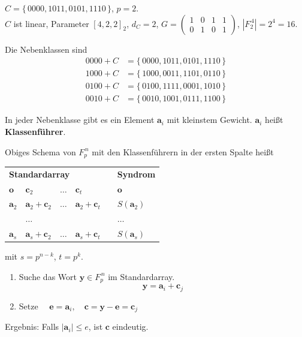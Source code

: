 \begin{beispiel}
$C = \{\, 0000, 1011, 0101, 1110 \,\}$, $p = 2$.\\
$C$ ist linear, Parameter $[4,2,2]_2$, $d_C = 2$,
$G = \begin{pmatrix} 1 & 0 & 1 & 1 \\ 0 & 1 & 0 & 1 \end{pmatrix}$, \quad $|F_2^{\,4}| = 2^4 = 16$.

Die Nebenklassen sind
\begin{align*}
  0000 + C &= \{\, 0000, 1011, 0101, 1110 \,\}\\
  1000 + C &= \{\, 1000, 0011, 1101, 0110 \,\}\\
  0100 + C &= \{\, 0100, 1111, 0001, 1010 \,\}\\
  0010 + C &= \{\, 0010, 1001, 0111, 1100 \,\}
\end{align*}
\end{beispiel}

\begin{definition}
In jeder Nebenklasse gibt es ein Element $\mathbf{a}_i$ mit kleinstem Gewicht.
$\mathbf{a}_i$ heißt \textbf{Klassenführer}.

Obiges Schema von $F_p^{\,n}$ mit den Klassenführern in der ersten Spalte heißt

\begin{center}
\begin{tabular}{llllll}
\multicolumn{4}{l}{\textbf{Standardarray}} & & \textbf{Syndrom}\\
$\mathbf{o}$ & $\mathbf{c}_2$ & $\dots$ & $\mathbf{c}_t$ & & $\mathbf{o}$\\
$\mathbf{a}_2$ & $\mathbf{a}_2 + \mathbf{c}_2$ & $\dots$ & $\mathbf{a}_2 + \mathbf{c}_t$ & & $S(\mathbf{a}_2)$\\
 & $\dots$ & & & & $\dots$\\
$\mathbf{a}_s$ & $\mathbf{a}_s + \mathbf{c}_2$ & $\dots$ & $\mathbf{a}_s + \mathbf{c}_t$ & & $S(\mathbf{a}_s)$
\end{tabular}
\end{center}
mit $s = p^{n-k}$, $t = p^k$.
\end{definition}

\begin{algorithmus}
\begin{enumerate}[label=\arabic*. Schritt:, leftmargin=*]
  \item Suche das Wort $\mathbf{y} \in F_p^{\,n}$ im Standardarray.
  \[ \mathbf{y} = \mathbf{a}_i + \mathbf{c}_j \]
  \item Setze $\quad \mathbf{e} = \mathbf{a}_i,\quad \mathbf{c} = \mathbf{y} - \mathbf{e} = \mathbf{c}_j$
\end{enumerate}
Ergebnis: Falls $|\mathbf{a}_i| \le e$, ist $\mathbf{c}$ eindeutig.
\end{algorithmus}

